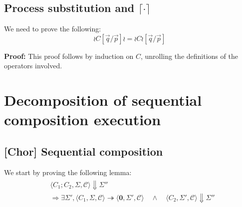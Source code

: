 \documentclass[12pt,a4paper,twoside]{book}
\begin{document}
\begin{appendices}
\section{Process substitution and $\lceil \cdot \rceil$}
We need to prove the following:
$$\wr C [\vec{q}/\vec{p}] \wr = \wr C \wr [\vec{q}/\vec{p}]$$

\noindent\textbf{Proof:}
This proof follows by induction on $C$, unrolling the definitions of the operators involved.


\chapter{Decomposition of sequential composition execution}
\label{appdix:B}
\section{\textbf{[Chor]} Sequential composition}
We start by proving the following lemma:
\begin{align}
\begin{split}
\label{appdix:Bskin}
&\langle C_1 ; C_2, \Sigma, \mathscr{C}\rangle \Downarrow \Sigma''\\
&\Rightarrow \exists \Sigma',
\langle C_1, \Sigma, \mathscr{C} \rangle \twoheadrightarrow \langle \boldsymbol{0}, \Sigma', \mathscr{C} \rangle 
\quad\land\quad
\langle C_2, \Sigma', \mathscr{C} \rangle \Downarrow \Sigma''
\end{split}
\end{align}


\end{appendices}
\end{document}
